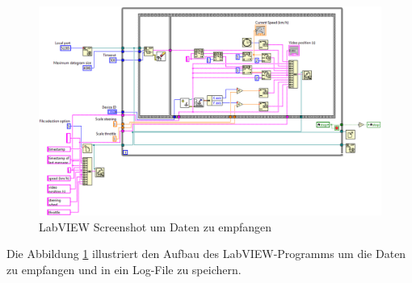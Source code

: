 \begin{figure}[H]
\centering 
\includegraphics[width=0.8\linewidth]{src/labview_screenshot_videoplayer_daten_empfangen.png}
\caption{LabVIEW Screenshot um Daten zu empfangen} %
\label{labview_screenshot_videoplayer_daten_empfangen} %
\end{figure}
Die Abbildung \ref{labview_screenshot_videoplayer_daten_empfangen} illustriert den Aufbau des LabVIEW-Programms um die Daten zu empfangen und in ein Log-File zu speichern.\\

